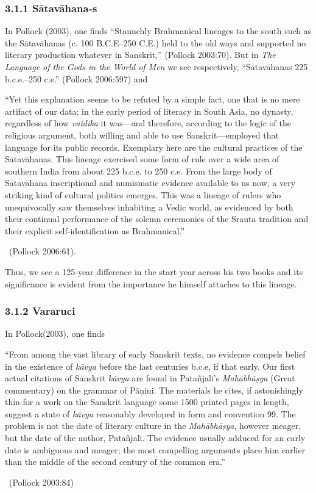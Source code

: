 \subsubsection*{3.1.1 Sātavāhana-s}

In Pollock (2003), one finds “Staunchly Brahmanical lineages to the south such as the Sātavāhanas (c. 100 B.C.E–250 C.E.) held to the old ways and supported no literary production whatever in Sanskrit,” (Pollock 2003:70). But in \textit{The Language of the Gods in the World of Men} we see respectively, “Sātavāhanas 225 b.c.e.–250 c.e.” (Pollock 2006:597) and

\begin{myquote}
“Yet this explanation seems to be refuted by a simple fact, one that is no mere artifact of our data: in the early period of literacy in South Asia, no dynasty, regardless of how \textit{vaidika} it was—and therefore, according to the logic of the religious argument, both willing and able to use Sanskrit—employed that language for its public records. Exemplary here are the cultural practices of the Sātavāhanas. This lineage exercised some form of rule over a wide area of southern India from about 225 b.c.e. to 250 c.e. From the large body of Sātavāhana inscriptional and numismatic evidence available to us now, a very striking kind of cultural politics emerges. This was a lineage of rulers who unequivocally saw themselves inhabiting a Vedic world, as evidenced by both their continual performance of the solemn ceremonies of the Srauta tradition and their explicit self-identification as Brahmanical.” 

~\hfill (Pollock 2006:61).
\end{myquote}

Thus, we see a 125-year difference in the start year across his two books and its significance is evident from the importance he himself attaches to this lineage.

\newpage

\subsubsection*{3.1.2 Vararuci}

In Pollock(2003), one finds

\begin{myquote}
“From among the vast library of early Sanskrit texts, no evidence compels belief in the existence of \textit{kāvya} before the last centuries b.c.e, if that early. Our first actual citations of Sanskrit \textit{kāvya} are found in Patañjali’s \textit{Mahābhāṣya} (Great commentary) on the grammar of Pāṇini. The materials he cites, if astonishingly thin for a work on the Sanskrit language some 1500 printed pages in length, suggest a state of \textit{kāvya} reasonably developed in form and convention 99. The problem is not the date of literary culture in the \textit{Mahābhāṣya}, however meager, but the date of the author, Patañjali. The evidence usually adduced for an early date is ambiguous and meager; the most compelling arguments place him earlier than the middle of the second century of the common era.” 

~\hfill (Pollock 2003:84)
\end{myquote}

